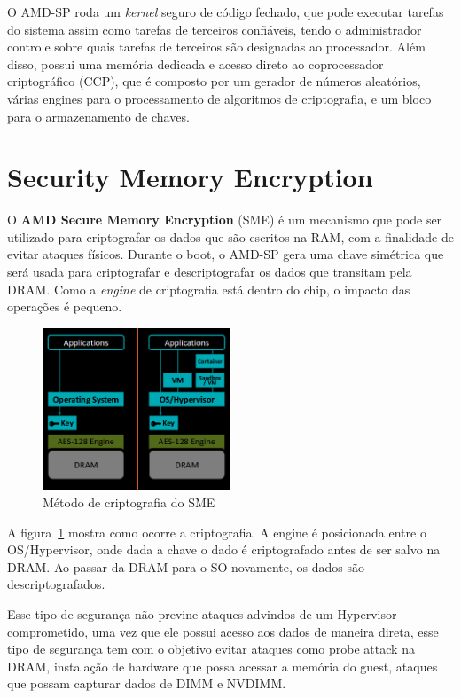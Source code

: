 \documentclass{report}
\newcommand{\todo}[1]{{\color{red} #1}}
\begin{document}
O AMD-SP roda um \textit{kernel} seguro de código fechado, que pode executar
tarefas do sistema assim como tarefas de terceiros confiáveis, tendo o
administrador controle sobre quais tarefas de terceiros são designadas ao
processador. Além disso, possui uma memória dedicada e acesso direto ao
coprocessador criptográfico (CCP), que é composto por um gerador de números
aleatórios, várias engines para o processamento de algoritmos de criptografia,
e um bloco para o armazenamento de chaves.

\section{Security Memory Encryption}
O \textbf{AMD Secure Memory Encryption} (SME) é um mecanismo que pode ser
utilizado para criptografar os dados que são escritos na RAM, com a finalidade
de evitar ataques físicos. Durante o boot, o AMD-SP gera uma chave simétrica
que será usada para criptografar e descriptografar os dados que transitam pela
DRAM. Como a \textit{engine} de criptografia está dentro do chip, o impacto das
operações é pequeno.

\begin{figure}[h]
    \centering
    \includegraphics[width=0.5\textwidth]{img/sme}
    \caption{Método de criptografia do SME}\label{sme-1}
\end{figure}

A figura~\ref{sme-1} mostra como ocorre a criptografia. A engine é posicionada
entre o OS/Hypervisor, onde dada a chave o dado é criptografado antes de ser
salvo na DRAM\@. Ao passar da DRAM para o SO novamente, os dados são
descriptografados.

Esse tipo de segurança não previne ataques advindos de um Hypervisor
comprometido, uma vez que ele possui acesso aos dados de maneira direta, esse
tipo de segurança tem com o objetivo evitar ataques como \todo{probe attack na
DRAM}, instalação de hardware que possa acessar a memória do guest, ataques que
possam capturar dados de DIMM e NVDIMM\@.
\end{document}
